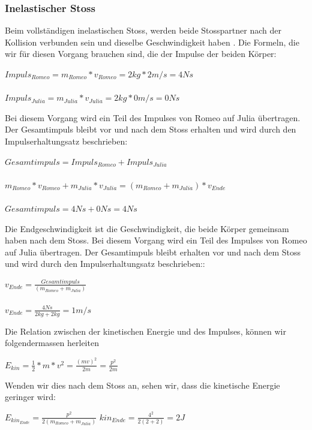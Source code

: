\documentclass[../main.tex]{subfiles}
\begin{document}
\subsubsection{Inelastischer Stoss}
Beim vollständigen inelastischen Stoss, werden beide Stosspartner nach der Kollision verbunden sein und dieselbe
Geschwindigkeit haben \cite{tiplerpaula.PhysikFurStudierende}. Die Formeln, die wir für diesen Vorgang brauchen sind,
die der Impulse der beiden Körper:
\begin{mdframed}
$Impuls_{Romeo} = m_{Romeo}*v_{Romeo} = 2kg * 2m/s = 4 Ns$\\\\
$Impuls_{Julia} = m_{Julia}*v_{Julia} = 2kg * 0m/s = 0Ns$
\end{mdframed}
 Bei diesem Vorgang wird ein Teil des Impulses von Romeo auf Julia übertragen. Der Gesamtimpuls bleibt vor
 und nach dem Stoss erhalten und wird durch den Impulserhaltungsatz beschrieben:%
\begin{mdframed}
$Gesamtimpuls = Impuls_{Romeo} + Impuls_{Julia}$
\\\\$m_{Romeo}*v_{Romeo} +  m_{Julia}*v_{Julia} = (m_{Romeo} + m_{Julia})*v_{Ende}$\\\\
$Gesamtimpuls = 4Ns + 0Ns = 4Ns$
\end{mdframed}
Die Endgeschwindigkeit ist die Geschwindigkeit, die beide Körper gemeinsam haben nach dem Stoss.
 Bei diesem Vorgang wird ein Teil des Impulses von Romeo auf Julia übertragen. Der Gesamtimpuls bleibt erhalten vor
 und nach dem Stoss und wird durch den Impulserhaltungsatz beschrieben:\cite{tiplerpaula.PhysikFurStudierende}:
\begin{mdframed}
$v_{Ende} = \frac{Gesamtimpuls}{(m_{Romeo} + m_{Julia})}$\\\\
$v_{Ende} = \frac{4Ns}{2kg + 2kg} = 1m/s$
\end{mdframed}

Die Relation zwischen der kinetischen Energie und des Impulses, können wir folgendermassen
herleiten %
\begin{mdframed}
$E_{kin}=\frac{1}{2} * m * v^{2} = \frac{(mv)^{2}}{2m} = \frac{p^{2}}{2m}$
\end{mdframed}
Wenden wir dies nach dem Stoss an, sehen wir, dass die kinetische Energie geringer wird:
\begin{mdframed}
$E_{kin_{Ende}}=\frac{p^{2}}{2(m_{Romeo} + m_{Julia})} $
${kin_{Ende}}=\frac{4^{2}}{2(2 + 2)} = 2J$
\end{mdframed}
\end{document}
